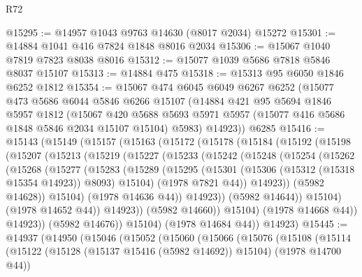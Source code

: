\begin{lexlean}{R72}
\begin{coremodule}
@15295 := @14957 @1043 @9763 @14630 (@8017 @2034) @15272
@15301 := @14884 @1041 @416 @7824 @1848 @8016 @2034
@15306 := @15067 @1040 @7819 @7823 @8038 @8016
@15312 := @15077 @1039 @5686 @7818 @5846 @8037 @15107
@15313 := @14884 @475
@15318 := @15313 @95 @6050 @1846 @6252 @1812
@15354 := @15067
    @474
    @6045
    @6049
    @6267
    @6252
    (@15077
      @473
      @5686
      @6044
      @5846
      @6266
      @15107
      (@14884
        @421
        @95
        @5694
        @1846
        @5957
        @1812
        (@15067
          @420
          @5688
          @5693
          @5971
          @5957
          (@15077 @416 @5686 @1848 @5846 @2034 @15107 @15104)
          @5983)
        @14923))
    @6285
@15416 := @15143
    (@15149
      (@15157
        (@15163
          (@15172
            (@15178
              (@15184
                (@15192
                  (@15198
                    (@15207
                      (@15213
                        (@15219
                          (@15227
                            (@15233
                              (@15242
                                (@15248
                                  (@15254
                                    (@15262
                                      (@15268
                                        (@15277
                                          (@15283
                                            (@15289
                                              (@15295
                                                (@15301
                                                  (@15306 (@15312 (@15318 @15354 @14923)) @8093)
                                                  @15104)
                                                (@1978 @7821 @44))
                                              @14923))
                                          (@5982 @14628))
                                        @15104)
                                      (@1978 @14636 @44))
                                    @14923))
                                (@5982 @14644))
                              @15104)
                            (@1978 @14652 @44))
                          @14923))
                      (@5982 @14660))
                    @15104)
                  (@1978 @14668 @44))
                @14923))
            (@5982 @14676))
          @15104)
        (@1978 @14684 @44))
      @14923)
@15445 := @14937
    (@14950
      (@15046
        (@15052
          (@15060
            (@15066
              (@15076
                (@15108
                  (@15114
                    (@15122 (@15128 (@15137 @15416 (@5982 @14692)) @15104) (@1978 @14700 @44))

\end{coremodule}
\end{lexlean}
